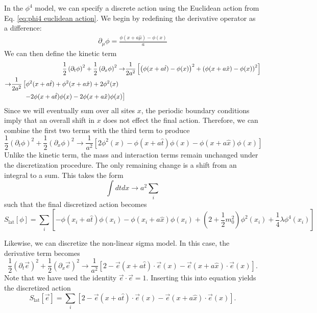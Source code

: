 \documentclass[12pt]{report}
\newcommand{\e}{\vec e}
\newcommand{\half}{\frac{1}{2}}
\begin{document}
In the $\phi^4$ model, we can specify a discrete action using the Euclidean action from Eq. \ref{eq:phi4 euclidean action}. We begin by redefining the derivative operator as a difference:
\begin{align}
    \partial_\mu \phi = \frac{\phi\left(x + a \hat{\mu}\right) - \phi(x)}{a}
\end{align}
We can then define the kinetic term
\begin{align}
    \half \left(\partial_t\phi\right)^2 + \half \left(\partial_x\phi\right)^2 \rightarrow& \frac{1}{2a^2}\left[ \left(\phi(x+a \hat{t}) -\phi(x)\right)^2 + \left(\phi(x+a \hat{x}) -\phi(x)\right)^2\right] \\
    \begin{split} \rightarrow& \frac{1}{2a^2}\left[ \phi^2(x+a\hat{t}) + \phi^2(x+a\hat{x}) + 2\phi^2(x)\right.\\ &\qquad \left.- 2\phi(x+a\hat{t})\phi(x) - 2\phi(x+a\hat{x})\phi(x) \right]\hfilneg\end{split}
\end{align}
Since we will eventually sum over all sites $x$, the periodic boundary conditions imply that an overall shift in $x$ does not effect the final action. Therefore, we can combine the first two terms with the third term to produce 
\begin{equation}
    \half \left(\partial_t\phi\right)^2 + \half \left(\partial_x\phi\right)^2 \rightarrow \frac{1}{a^2}\left[ 2\phi^2(x) - \phi(x+a\hat{t})\phi(x) - \phi(x+a\hat{x})\phi(x) \right]
\end{equation}
Unlike the kinetic term, the mass and interaction terms remain unchanged under the discretization procedure. The only remaining change is a shift from an integral to a sum. This takes the form
\begin{equation}
    \int dtdx \rightarrow a^2 \sum_i
\end{equation}
such that the final discretized action becomes
\begin{equation}
    \label{eq:phi4 discretized action}
    S_{\mathrm{lat}}[\phi] = \sum_i \left[-\phi(x_i + a\hat{t})\phi(x_i) - \phi(x_i + a\hat{x})\phi(x_i) + \left(2+\half m_0^2\right)\phi^2(x_i) + \frac{1}{4}\lambda \phi^4(x_i)\right]
\end{equation}

Likewise, we can discretize the non-linear sigma model. In this case, the derivative term becomes 
\begin{equation}
    \half \left(\partial_t\e\right)^2 + \half \left(\partial_x\e\right)^2 \rightarrow \frac{1}{a^2}\left[ 2 - \e(x+a\hat{t})\cdot\e(x) - \e(x+a\hat{x})\cdot\e(x) \right].
\end{equation}
Note that we have used the identity $\e\cdot\e = 1$. Inserting this into equation\label{eq:nlsm euclidean action} yields the discretized action
\begin{equation}
    \label{eq:nlsm discretized action}
    S_\mathrm{lat}[\e] = \sum_i \left[ 2 - \e(x+a\hat{t})\cdot\e(x) - \e(x+a\hat{x})\cdot\e(x) \right].
\end{equation}
\end{document}
